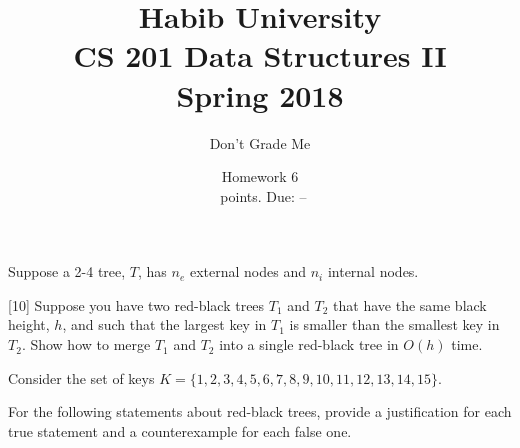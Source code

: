 \documentclass[addpoints]{exam}
\title{Habib University\\CS 201 Data Structures II\\Spring 2018}
\author{Don't Grade Me}  %
\date{Homework 6\\\numpoints\ points. Due: --}
\begin{document}
\maketitle

\begin{questions}

  Suppose a 2-4 tree, $T$, has $n_e$ external nodes and $n_i$ internal nodes.

  [10]
  Suppose you have two red-black trees $T_1$ and $T_2$ that have the same black height, $h$, and such that the largest key in $T_1$ is smaller than the smallest key in $T_2$. Show how to merge $T_1$ and $T_2$ into a single red-black tree in $O(h)$ time.
  
  \question
  Consider the set of keys $K = \{1,2,3,4,5,6,7,8,9,10,11,12,13,14,15\}$.
  \begin{solution}
  \end{solution}

  \question[10]
  For the following statements about red-black trees, provide a justification for each true statement and a counterexample for each false one.
  \begin{parts}

\end{parts}
\end{questions}
\end{document}
